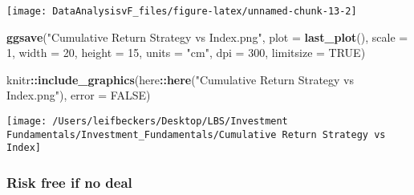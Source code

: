 \documentclass[
]{article}
\newenvironment{Shaded}{\begin{snugshade}}{\end{snugshade}}
\newcommand{\DataTypeTok}[1]{\textcolor[rgb]{0.13,0.29,0.53}{#1}}
\newcommand{\DecValTok}[1]{\textcolor[rgb]{0.00,0.00,0.81}{#1}}
\newcommand{\KeywordTok}[1]{\textcolor[rgb]{0.13,0.29,0.53}{\textbf{#1}}}
\newcommand{\NormalTok}[1]{#1}
\newcommand{\OperatorTok}[1]{\textcolor[rgb]{0.81,0.36,0.00}{\textbf{#1}}}
\newcommand{\OtherTok}[1]{\textcolor[rgb]{0.56,0.35,0.01}{#1}}
\newcommand{\StringTok}[1]{\textcolor[rgb]{0.31,0.60,0.02}{#1}}
\begin{document}
\begin{center}\texttt{[image: DataAnalysisvF\_files/figure-latex/unnamed-chunk-13-2]} \end{center}

\begin{Shaded}
\begin{Highlighting}[]
\KeywordTok{ggsave}\NormalTok{(}\StringTok{"Cumulative Return Strategy vs Index.png"}\NormalTok{,}
       \DataTypeTok{plot =} \KeywordTok{last\_plot}\NormalTok{(),}
       \DataTypeTok{scale =} \DecValTok{1}\NormalTok{,}
       \DataTypeTok{width =} \DecValTok{20}\NormalTok{,}
       \DataTypeTok{height =} \DecValTok{15}\NormalTok{,}
       \DataTypeTok{units =} \StringTok{"cm"}\NormalTok{,}
       \DataTypeTok{dpi =} \DecValTok{300}\NormalTok{,}
       \DataTypeTok{limitsize =} \OtherTok{TRUE}\NormalTok{)}

\NormalTok{knitr}\OperatorTok{::}\KeywordTok{include\_graphics}\NormalTok{(here}\OperatorTok{::}\KeywordTok{here}\NormalTok{(}\StringTok{"Cumulative Return Strategy vs Index.png"}\NormalTok{), }\DataTypeTok{error =} \OtherTok{FALSE}\NormalTok{)}
\end{Highlighting}
\end{Shaded}

\begin{center}\texttt{[image: /Users/leifbeckers/Desktop/LBS/Investment Fundamentals/Investment\_Fundamentals/Cumulative Return Strategy vs Index]} \end{center}

\hypertarget{risk-free-if-no-deal}{%
\subsubsection{Risk free if no deal}\label{risk-free-if-no-deal}}
\end{document}

